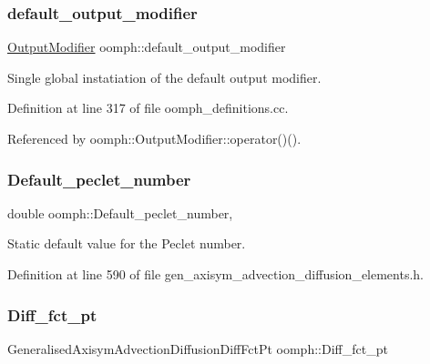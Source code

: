 \subsubsection{\texorpdfstring{default\+\_\+output\+\_\+modifier}{default\_output\_modifier}}
{\footnotesize\ttfamily \hyperlink{classoomph_1_1OutputModifier}{Output\+Modifier} oomph\+::default\+\_\+output\+\_\+modifier}



Single global instatiation of the default output modifier. 



Definition at line 317 of file oomph\+\_\+definitions.\+cc.



Referenced by oomph\+::\+Output\+Modifier\+::operator()().

\mbox{\label{namespaceoomph_a76008dfc377a12c79c93b9c506577c63}} 
\subsubsection{\texorpdfstring{Default\+\_\+peclet\+\_\+number}{Default\_peclet\_number}}
{\footnotesize\ttfamily double oomph\+::\+Default\+\_\+peclet\+\_\+number\hspace{0.3cm}{\ttfamily [static]}, {\ttfamily [private]}}



Static default value for the Peclet number. 



Definition at line 590 of file gen\+\_\+axisym\+\_\+advection\+\_\+diffusion\+\_\+elements.\+h.

\mbox{\label{namespaceoomph_a213e9eeb52fa6ea98254de45f1ba4f98}} 
\subsubsection{\texorpdfstring{Diff\+\_\+fct\+\_\+pt}{Diff\_fct\_pt}}
{\footnotesize\ttfamily Generalised\+Axisym\+Advection\+Diffusion\+Diff\+Fct\+Pt oomph\+::\+Diff\+\_\+fct\+\_\+pt\hspace{0.3cm}{\ttfamily [protected]}}



